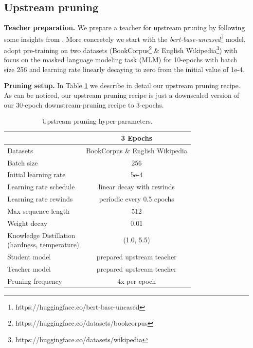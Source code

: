 \documentclass[11pt]{article}
\newcommand{\greyrule}{\arrayrulecolor{black!30}\midrule\arrayrulecolor{black}}
\begin{document}
\subsection{Upstream pruning}
\label{app:hyperparams-UpstreamPruning}

\noindent\textbf{Teacher preparation.} We prepare a teacher for upstream pruning by following some insights from \cite{Liu2019RoBERTaAR}. More concretely we start with the \textit{bert-base-uncased}\footnote{https://huggingface.co/bert-base-uncased} model, adopt pre-training on two datasets (BookCorpus\footnote{https://huggingface.co/datasets/bookcorpus} \& English Wikipedia\footnote{https://huggingface.co/datasets/wikipedia}) with focus on the masked language modeling task (MLM) for 10-epochs with batch size 256 and learning rate linearly decaying to zero from the initial value of 1e-4. 

\noindent\textbf{Pruning setup.} In Table \ref{tab:hyperparams-UpstreamPruning} we describe in detail our upstream pruning recipe. As can be noticed, our upstream pruning recipe is just a downscaled version of our 30-epoch downstream-pruning recipe to 3-epochs.

\begin{table}
      \centering
         {\small 
            \begin{tabular}{l|c}
            \toprule
            & 3 Epochs \\
            \midrule
            Datasets & BookCorpus \& English Wikipedia \\
            \greyrule
            Batch size & 256 \\
            \greyrule
            Initial learning rate & 5e-4 \\
            Learning rate schedule & linear decay with rewinds \\
            Learning rate rewinds & periodic every 0.5 epochs \\
            \greyrule
            Max sequence length & 512 \\
            Weight decay & 0.01 \\
            \greyrule
            \makecell{Knowledge Distillation\\(hardness, temperature)} & (1.0, 5.5) \\
            \greyrule
            Student model & prepared upstream teacher \\
            Teacher model & prepared upstream teacher \\
            \greyrule
            Pruning frequency & 4x per epoch \\
            \bottomrule
            \end{tabular}
        }
            \caption{Upstream pruning hyper-parameters.}
            \label{tab:hyperparams-UpstreamPruning}
\end{table}
\end{document}
